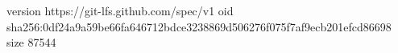 version https://git-lfs.github.com/spec/v1
oid sha256:0df24a9a59be66fa646712bdce3238869d506276f075f7af9ecb201efcd86698
size 87544

